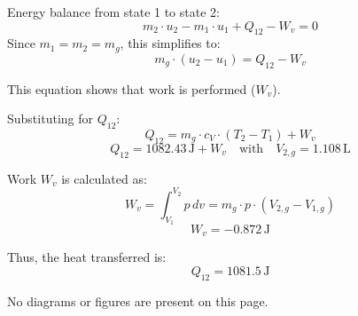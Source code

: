 Energy balance from state 1 to state 2:  
\[
m_2 \cdot u_2 - m_1 \cdot u_1 + Q_{12} - W_v = 0
\]  
Since \( m_1 = m_2 = m_g \), this simplifies to:  
\[
m_g \cdot (u_2 - u_1) = Q_{12} - W_v
\]  

This equation shows that work is performed (\( W_v \)).

Substituting for \( Q_{12} \):  
\[
Q_{12} = m_g \cdot c_V \cdot (T_2 - T_1) + W_v
\]  
\[
Q_{12} = 1082.43 \, \text{J} + W_v \quad \text{with} \quad V_{2,g} = 1.108 \, \text{L}
\]  

Work \( W_v \) is calculated as:  
\[
W_v = \int_{V_1}^{V_2} p \, dv = m_g \cdot p \cdot (V_{2,g} - V_{1,g})
\]  
\[
W_v = -0.872 \, \text{J}
\]  

Thus, the heat transferred is:  
\[
Q_{12} = 1081.5 \, \text{J}
\]  

No diagrams or figures are present on this page.